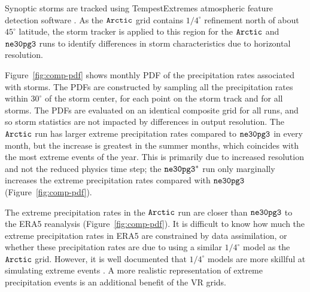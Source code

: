 \documentclass[draft]{agujournal2019}
\begin{document}
Synoptic storms are tracked using TempestExtremes atmospheric feature detection software \cite{UETAL2021}. As the $\tt Arctic$ grid contains $1/4^{\circ}$ refinement north of about $45^{\circ}$ latitude, the storm tracker is applied to this region for the $\tt Arctic$ and $\tt ne30pg3$ runs to identify differences in storm characteristics due to horizontal resolution.

Figure~\ref{fig:comp-pdf} shows monthly PDF {\color{blue}{(probability density function)}} of the precipitation rates associated with storms. The PDFs are constructed by sampling all the precipitation rates within $30^{\circ}$ of the storm center, for each point on the storm track and for all storms. The PDFs are evaluated on an identical composite grid for all runs, and so storm statistics are not impacted by differences in output resolution. The $\tt Arctic$ run has larger extreme precipitation rates compared to $\tt ne30pg3$ in every month, but the increase is greatest in the summer months, which coincides with the most extreme events of the year. This is primarily due to increased resolution and not the reduced physics time step; the $\tt ne30pg3^{*}$ run only marginally increases the extreme precipitation rates compared with $\tt ne30pg3$ (Figure~\ref{fig:comp-pdf}).

The extreme precipitation rates in the $\tt Arctic$ run are closer than $\tt ne30pg3$ to the ERA5 reanalysis (Figure~\ref{fig:comp-pdf}). It is difficult to know how much the extreme precipitation rates in ERA5 are constrained by data assimilation, or whether these precipitation rates are due to using a similar $1/4^{\circ}$ model as the $\tt Arctic$ grid. However, it is well documented that $1/4^{\circ}$ models are more skillful at simulating extreme events \cite{BetAl2013JC,OETAL2016JAMES}.  A more realistic representation of extreme precipitation events is an additional benefit of the VR grids.
\end{document}
